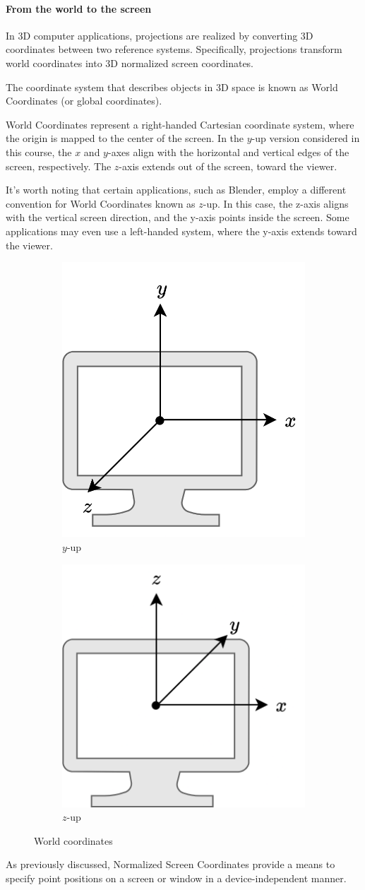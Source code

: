 \paragraph*{From the world to the screen}
In 3D computer applications, projections are realized by converting 3D coordinates between two reference systems. Specifically, projections transform world coordinates into 3D normalized screen coordinates.

The coordinate system that describes objects in 3D space is known as World Coordinates (or global coordinates).

World Coordinates represent a right-handed Cartesian coordinate system, where the origin is mapped to the center of the screen. 
In the $y$-up version considered in this course, the $x$ and $y$-axes align with the horizontal and vertical edges of the screen, respectively. 
The $z$-axis extends out of the screen, toward the viewer.

It's worth noting that certain applications, such as Blender, employ a different convention for World Coordinates known as $z$-up. 
In this case, the z-axis aligns with the vertical screen direction, and the y-axis points inside the screen.
Some applications may even use a left-handed system, where the y-axis extends toward the viewer.
\begin{figure}[H]
    \centering
    \begin{subfigure}{0.49\textwidth}
        \centering
        \includegraphics[width=0.4\linewidth]{images/yup.png} 
        \caption{$y$-up}
    \end{subfigure}
    \begin{subfigure}{0.49\textwidth}
        \centering
        \includegraphics[width=0.4\linewidth]{images/zup.png}
        \caption{$z$-up}
    \end{subfigure}
    \caption{World coordinates}
\end{figure}
As previously discussed, Normalized Screen Coordinates provide a means to specify point positions on a screen or window in a device-independent manner.

